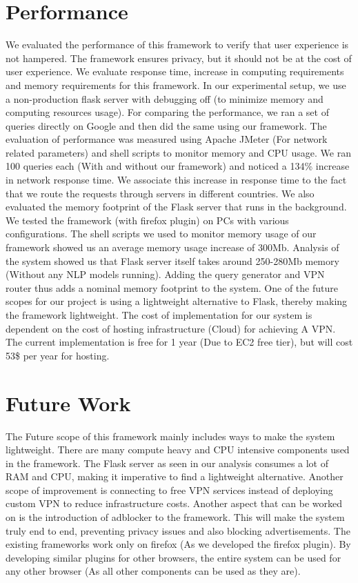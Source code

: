 \documentclass[10pt, a4paper, twocolumn]{article} %
\begin{document}
\section{Performance}
We evaluated the performance of this framework to verify that user experience is not hampered. The framework ensures privacy, but it should not be at the cost of user experience. We evaluate response time, increase in computing requirements and memory requirements for this framework. In our experimental setup, we use a non-production flask server with debugging off (to minimize memory and computing resources usage). For comparing the performance, we ran a set of queries directly on Google and then did the same using our framework. The evaluation of performance was measured using Apache JMeter (For network related parameters) and shell scripts to monitor memory and CPU usage. We ran 100 queries each (With and without our framework) and noticed a 134\% increase in network response time. We associate this increase in response time to the fact that we route the requests through servers in different countries. We also evaluated the memory footprint of the Flask server that runs in the background. We tested the framework (with firefox plugin) on PCs with various configurations. The shell scripts we used to monitor memory usage of our framework showed us an average memory usage increase of 300Mb. Analysis of the system showed us that Flask server itself takes around 250-280Mb memory (Without any NLP models running). Adding the query generator and VPN router thus adds a nominal memory footprint to the system. One of the future scopes for our project is using a lightweight alternative to Flask, thereby making the framework lightweight.  \newline
The cost of implementation for our system is dependent on the cost of hosting infrastructure (Cloud) for achieving 
A VPN. The current implementation is free for 1 year (Due to EC2 free tier), but will cost 53\$ per year for hosting.

\section{Future Work}
The Future scope of this framework mainly includes ways to make the system lightweight. There are many compute heavy and CPU intensive components used in the framework. The Flask server as seen in our analysis consumes a lot of RAM and CPU, making it imperative to find a lightweight alternative. Another scope of improvement is connecting to free VPN services instead of deploying custom VPN to reduce infrastructure costs. Another aspect that can be worked on is the introduction of adblocker to the framework. This will make the system truly end to end, preventing privacy issues and also blocking advertisements. The existing frameworks work only on firefox (As we developed the firefox plugin). By developing similar plugins for other browsers, the entire system can be used for any other browser (As all other components can be used as they are). 
\end{document}
